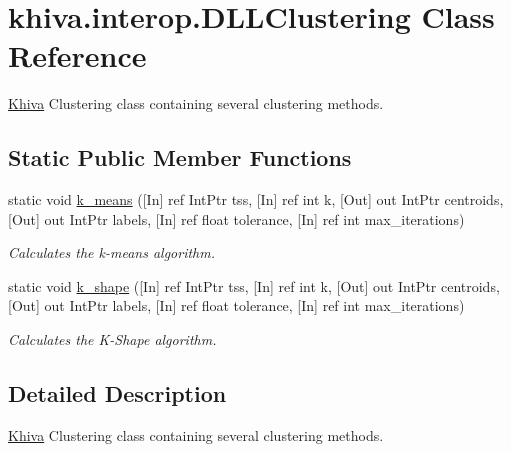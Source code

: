 \hypertarget{classkhiva_1_1interop_1_1_d_l_l_clustering}{}\section{khiva.\+interop.\+D\+L\+L\+Clustering Class Reference}
\label{classkhiva_1_1interop_1_1_d_l_l_clustering}


\mbox{\hyperlink{classkhiva_1_1_khiva}{Khiva}} Clustering class containing several clustering methods.  


\subsection*{Static Public Member Functions}
\begin{DoxyCompactItemize}
\item 
static void \mbox{\hyperlink{classkhiva_1_1interop_1_1_d_l_l_clustering_a1ee5a73f1c1cd9bbf4e4c6e8274473ee}{k\+\_\+means}} (\mbox{[}In\mbox{]} ref Int\+Ptr tss, \mbox{[}In\mbox{]} ref int k, \mbox{[}Out\mbox{]} out Int\+Ptr centroids, \mbox{[}Out\mbox{]} out Int\+Ptr labels, \mbox{[}In\mbox{]} ref float tolerance, \mbox{[}In\mbox{]} ref int max\+\_\+iterations)
\begin{DoxyCompactList}\small\item\em Calculates the k-\/means algorithm. \end{DoxyCompactList}\item 
static void \mbox{\hyperlink{classkhiva_1_1interop_1_1_d_l_l_clustering_a94b4cc72d14549e2a0bcadf85fd73965}{k\+\_\+shape}} (\mbox{[}In\mbox{]} ref Int\+Ptr tss, \mbox{[}In\mbox{]} ref int k, \mbox{[}Out\mbox{]} out Int\+Ptr centroids, \mbox{[}Out\mbox{]} out Int\+Ptr labels, \mbox{[}In\mbox{]} ref float tolerance, \mbox{[}In\mbox{]} ref int max\+\_\+iterations)
\begin{DoxyCompactList}\small\item\em Calculates the K-\/\+Shape algorithm. \end{DoxyCompactList}\end{DoxyCompactItemize}


\subsection{Detailed Description}
\mbox{\hyperlink{classkhiva_1_1_khiva}{Khiva}} Clustering class containing several clustering methods. 



